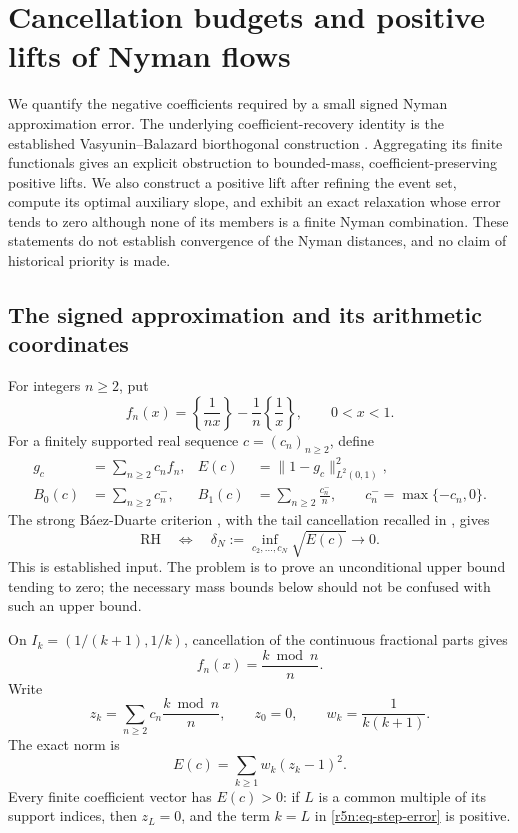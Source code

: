 \documentclass[11pt,a4paper]{article}
\theoremstyle{definition}\newtheorem{definition}[theorem]{Definition}
\theoremstyle{remark}\newtheorem{remark}[theorem]{Remark}
\numberwithin{equation}{section}
\begin{document}
\section{Cancellation budgets and positive lifts of Nyman flows}
\label{r5n:sec}

We quantify the negative coefficients required by a small signed
Nyman approximation error. The underlying coefficient-recovery
identity is the established Vasyunin--Balazard biorthogonal
construction \cite[Sections~1--2]{Balazard}. Aggregating its finite
functionals gives an explicit obstruction to bounded-mass,
coefficient-preserving positive lifts. We also construct a positive
lift after refining the event set, compute its optimal auxiliary
slope, and exhibit an exact relaxation whose error tends to zero
although none of its members is a finite Nyman combination.
These statements do not establish convergence of the Nyman distances,
and no claim of historical priority is made.

\subsection{The signed approximation and its arithmetic coordinates}
\label{r5n:subsec-setup}

For integers \(n\ge2\), put
\[
 f_n(x)=\left\{\frac1{nx}\right\}
        -\frac1n\left\{\frac1x\right\},
 \qquad 0<x<1.
\]
For a finitely supported real sequence \(c=(c_n)_{n\ge2}\), define
\begin{equation}
\label{r5n:eq-definitions}
 \begin{aligned}
 g_c&=\sum_{n\ge2}c_nf_n,
 &E(c)&=\|1-g_c\|_{L^2(0,1)}^2,\\
 B_0(c)&=\sum_{n\ge2}c_n^-,
 &B_1(c)&=\sum_{n\ge2}\frac{c_n^-}{n},
 \qquad c_n^-=\max\{-c_n,0\}.
 \end{aligned}
\end{equation}
The strong B\'aez-Duarte criterion \cite{BaezDuarte}, with the
tail cancellation recalled in \cite{TransferZeta}, gives
\[
 \mathrm{RH}
 \quad\Longleftrightarrow\quad
 \delta_N:=\inf_{c_2,\ldots,c_N}\sqrt{E(c)}
                   \longrightarrow0.
\]
This is established input. The problem is to prove an unconditional
upper bound tending to zero; the necessary mass bounds below
should not be confused with such an upper bound.

On \(I_k=(1/(k+1),1/k)\), cancellation of the continuous fractional
parts gives
\[
 f_n(x)=\frac{k\bmod n}{n}.
\]
Write
\begin{equation}
\label{r5n:eq-residues}
 z_k=\sum_{n\ge2}c_n\frac{k\bmod n}{n},
 \qquad z_0=0,\qquad w_k=\frac1{k(k+1)}.
\end{equation}
The exact norm is
\begin{equation}
\label{r5n:eq-step-error}
 E(c)=\sum_{k\ge1}w_k(z_k-1)^2.
\end{equation}
Every finite coefficient vector has \(E(c)>0\): if \(L\) is a
common multiple of its support indices, then \(z_L=0\), and the
term \(k=L\) in \eqref{r5n:eq-step-error} is positive.
\end{document}
